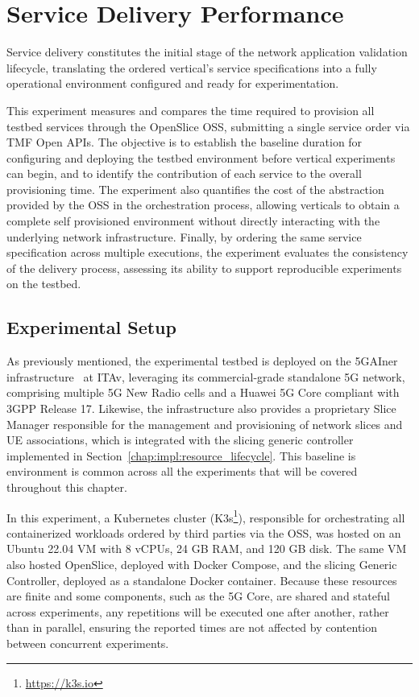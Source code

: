 \section{Service Delivery Performance}
\label{chap:results:delivery}

Service delivery constitutes the initial stage of the network application validation lifecycle, translating the ordered vertical's service specifications into a fully operational environment configured and ready for experimentation.

This experiment measures and compares the time required to provision all testbed services through the OpenSlice \acs{OSS}, submitting a single service order via \acs{TMF} Open \acsp{API}. The objective is to establish the baseline duration for configuring and deploying the testbed environment before vertical experiments can begin, and to identify the contribution of each service to the overall provisioning time. The experiment also quantifies the cost of the abstraction provided by the \acs{OSS} in the orchestration process, allowing verticals to obtain a complete self provisioned environment without directly interacting with the underlying network infrastructure. Finally, by ordering the same service specification across multiple executions, the experiment evaluates the consistency of the delivery process, assessing its ability to support reproducible experiments on the testbed.

\subsection{Experimental Setup}
\label{chap:results:delivery:setup}

As previously mentioned, the experimental testbed is deployed on the 5GAIner infrastructure~\cite{5GAIner} at \acs{ITAv}, leveraging its commercial-grade standalone \acs{5G} network, comprising multiple \acs{5G} New Radio cells and a Huawei \acs{5G} Core compliant with \acs{3GPP} Release 17. Likewise, the infrastructure also provides a proprietary Slice Manager responsible for the management and provisioning of network slices and \acs{UE} associations, which is integrated with the slicing generic controller implemented in Section~\ref{chap:impl:resource_lifecycle}. This baseline is environment is common across all the experiments that will be covered throughout this chapter.

In this experiment, a Kubernetes cluster (K3s\footnote{\url{https://k3s.io}}), responsible for orchestrating all containerized workloads ordered by third parties via the \acs{OSS}, was hosted on an Ubuntu 22.04 \acs{VM} with 8 vCPUs, 24 GB \acs{RAM}, and 120 GB disk. The same \acs{VM} also hosted OpenSlice, deployed with Docker Compose, and the slicing Generic Controller, deployed as a standalone Docker container. Because these resources are finite and some components, such as the \acs{5G} Core, are shared and stateful across experiments, any repetitions will be executed one after another, rather than in parallel, ensuring the reported times are not affected by contention between concurrent experiments.

